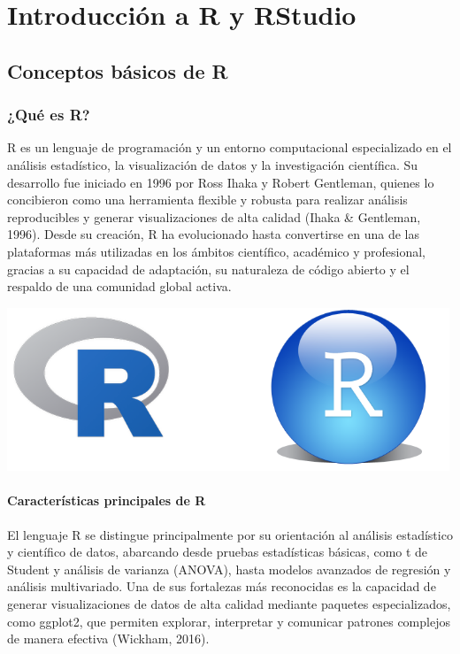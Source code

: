 \documentclass[
  spanish,
  a4paper,
  DIV=11,
  numbers=noendperiod,
  onepage,
  openany]{scrreprt}
\begin{document}
\part{Introducción a R y RStudio}


\chapter{Conceptos básicos de R}\label{conceptos-buxe1sicos-de-r}

\section{¿Qué es R?}\label{quuxe9-es-r}

R es un lenguaje de programación y un entorno computacional
especializado en el análisis estadístico, la visualización de datos y la
investigación científica. Su desarrollo fue iniciado en 1996 por Ross
Ihaka y Robert Gentleman, quienes lo concibieron como una herramienta
flexible y robusta para realizar análisis reproducibles y generar
visualizaciones de alta calidad (Ihaka \& Gentleman, 1996). Desde su
creación, R ha evolucionado hasta convertirse en una de las plataformas
más utilizadas en los ámbitos científico, académico y profesional,
gracias a su capacidad de adaptación, su naturaleza de código abierto y
el respaldo de una comunidad global activa.

\begin{center}
\includegraphics[width=5.20833in,height=\textheight,keepaspectratio]{index_files/mediabag/0-CtJIRkWvZK_8GnzM.png}
\end{center}

\subsection{Características principales de
R}\label{caracteruxedsticas-principales-de-r}

El lenguaje R se distingue principalmente por su orientación al análisis
estadístico y científico de datos, abarcando desde pruebas estadísticas
básicas, como t de Student y análisis de varianza (ANOVA), hasta modelos
avanzados de regresión y análisis multivariado. Una de sus fortalezas
más reconocidas es la capacidad de generar visualizaciones de datos de
alta calidad mediante paquetes especializados, como ggplot2, que
permiten explorar, interpretar y comunicar patrones complejos de manera
efectiva (Wickham, 2016).
\end{document}
